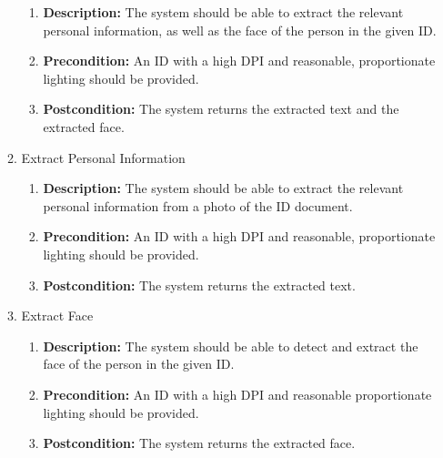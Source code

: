 \documentclass{article}
\begin{document}
\begin{enumerate}
\begin{enumerate}
\begin{enumerate}
					\item \textbf{Description:} The system should be able to extract the relevant personal information, as well as the face of the person in the given ID.
					\item \textbf{Precondition:} An ID with a high DPI and reasonable, proportionate lighting should be provided.
					\item \textbf{Postcondition:} The system returns the extracted text and the extracted face.
				\end{enumerate}
				\item Extract Personal Information
				\begin{enumerate}
					\item \textbf{Description:} The system should be able to extract the relevant personal information from a photo of the ID document.
					\item \textbf{Precondition:} An ID with a high DPI and reasonable, proportionate lighting should be provided.
					\item \textbf{Postcondition:} The system returns the extracted text.
				\end{enumerate}
				\item Extract Face
				\begin{enumerate}
					\item \textbf{Description:} The system should be able to detect and extract the face of the person in the given ID.
					\item \textbf{Precondition:} An ID with a high DPI and reasonable proportionate lighting should be provided.
					\item \textbf{Postcondition:} The system returns the extracted face.
				\end{enumerate}
			\end{enumerate}
		\end{enumerate}
\end{document}
